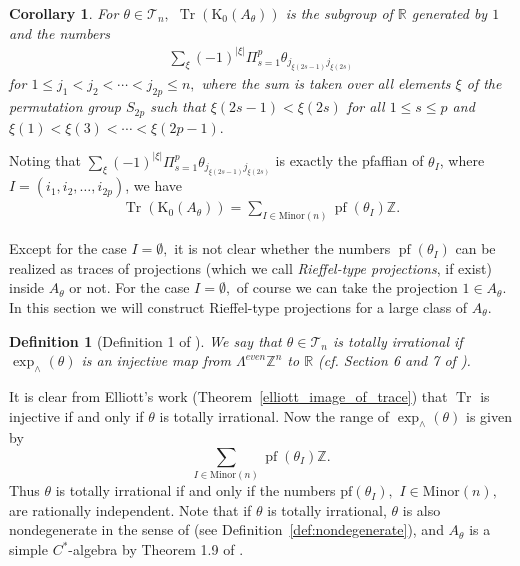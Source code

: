 \documentclass[9pt, BCOR=2mm]{amsart}
\numberwithin{equation}{section}
\numberwithin{equation}{section}
\newtheorem{corollary}[theorem]{Corollary}
\newtheorem{definition}[theorem]{Definition}
\newcommand{\pf}{{\operatorname{pf}}}
\newcommand{\K}{\mathrm{K}} %
\DeclareMathOperator{\Tr}{Tr}
\newcommand{\m}[2]{\ensuremath{{#1}_{#2}}}
\begin{document}
\begin{corollary} For $\theta\in \mathcal{T}_n,$
$\Tr(\K_0(A_{\theta}))$ is the subgroup of $\mathbb{R}$ generated by $1$ and the numbers
\begin{eqnarray}
\sum_{\xi}(-1)^{|\xi|}\Pi_{s=1}^{p}\theta_{j_{\xi (2s-1)}j_{\xi(2s)}}\nonumber
\end{eqnarray} for
$1\leq j_1<j_2<\cdots<j_{2p}\leq n,$ where the sum is taken over all elements
$\xi$ of the permutation group $S_{2p}$ such that $\xi(2s-1)<\xi(2s)$ for all
$1\leq s\leq p$ and $\xi(1)<\xi(3)<\cdots<\xi(2p-1).$
\end{corollary}

Noting that $\sum_{\xi}(-1)^{|\xi|}\Pi_{s=1}^{p}\theta_{j_{\xi (2s-1)}j_{\xi(2s)}}$ is exactly the pfaffian of $\m{\theta}{I}$,
where $I=(i_1,i_2,\dots,i_{2p})$, we have
\begin{eqnarray}\label{range of trace}
  \Tr(\K_0(A_{\theta}))=\sum\limits_{I\in \mathrm{Minor}(n)}{\pf}(\m{\theta}{I})\mathbb{Z}.
\end{eqnarray}


Except for the case $I=\emptyset,$ it is not clear whether the numbers ${\pf}(\m{\theta}{I})$ can be realized as traces of projections (which we call \emph{Rieffel-type projections}, if exist) inside $A_{\theta}$ or not. For the case $I=\emptyset,$ of course we can take the projection $1\in A_{\theta}.$  In this section we will construct Rieffel-type projections for a large class of $A_{\theta}.$



\begin{definition}[Definition 1 of \cite{FW93}]\label{df totally irrational}
  We say that $\theta\in\mathcal{T}_n$ is {\it totally irrational} if $\operatorname{exp}_{\wedge}(\theta)$ is an injective map from $\Lambda^{even}\mathbb{Z}^n$ to $\mathbb{R}$ (cf. Section 6 and 7 of \cite{Rie88}).
\end{definition}

It is clear from Elliott's work (Theorem~\ref{elliott_image_of_trace}) that $\Tr$ is injective if and only if $\theta$ is totally irrational.  Now the range of $\operatorname{exp}_{\wedge}(\theta)$ is given by
$$\sum\limits_{I\in \mathrm{Minor}(n)}{\pf}(\m{\theta}{I})\mathbb{Z}.$$ 
Thus $\theta$ is totally irrational if and only if the numbers $\mathrm{pf}(\m{\theta}{I}),$ $I\in \mathrm{Minor}(n),$ are rationally independent. Note that if $\theta$ is totally irrational, $\theta$ is also nondegenerate in the sense of \cite{Phi06} (see Definition~\ref{def:nondegenerate}), and $A_{\theta}$ is a simple $C^*$-algebra by Theorem 1.9 of \cite{Phi06}.
\end{document}
